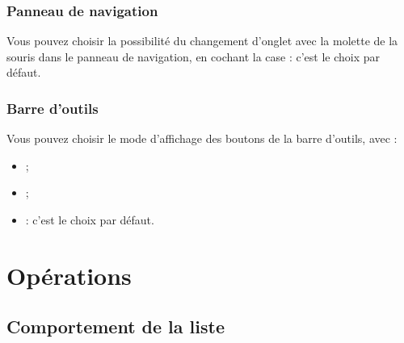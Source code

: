 \subsubsection{Panneau de navigation}

Vous pouvez choisir la possibilité du changement d'onglet avec la molette de la souris dans le panneau de navigation, en cochant la case  : c'est le choix par défaut.


\subsubsection{Barre d'outils}

Vous pouvez choisir le mode d'affichage des boutons de la barre d'outils, avec :
\begin{itemize}
	\item {} ;
	\item {} ;
	\item {} : c'est le choix par défaut.
\end{itemize}


\section{Opérations\label{setup-operations}}


\subsection{Comportement de la liste\label{setup-operations-list}}


